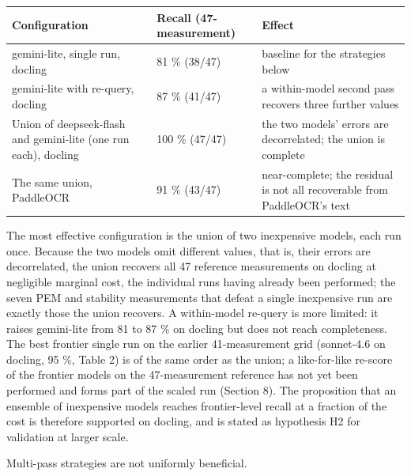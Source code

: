 \begin{longtable}[]{@{}L{0.40}L{0.16}L{0.34}@{}}
\toprule\noalign{}
Configuration & Recall (47-measurement) & Effect \\
\midrule\noalign{}
\endhead
\bottomrule\noalign{}
\endlastfoot
gemini-lite, single run, docling & 81 \% (38/47) & baseline for the
strategies below \\
gemini-lite with re-query, docling & 87 \% (41/47) & a within-model
second pass recovers three further values \\
Union of deepseek-flash and gemini-lite (one run each), docling & 100 \%
(47/47) & the two models' errors are decorrelated; the union is complete \\
The same union, PaddleOCR & 91 \% (43/47) & near-complete; the residual is
not all recoverable from PaddleOCR's text \\
\end{longtable}

The most effective configuration is the union of two inexpensive models,
each run once. Because the two models omit different values, that is,
their errors are decorrelated, the union recovers all 47 reference
measurements on docling at negligible marginal cost, the individual runs
having already been performed; the seven PEM and stability measurements
that defeat a single inexpensive run are exactly those the union
recovers. A within-model re-query is more limited: it raises gemini-lite
from 81 to 87 \% on docling but does not reach completeness. The best
frontier single run on the earlier 41-measurement grid (sonnet-4.6 on
docling, 95 \%, Table 2) is of the same order as the union; a
like-for-like re-score of the frontier models on the 47-measurement
reference has not yet been performed and forms part of the scaled run
(Section 8). The proposition that an ensemble of inexpensive models
reaches frontier-level recall at a fraction of the cost is therefore
supported on docling, and is stated as hypothesis H2 for validation at
larger scale.

Multi-pass strategies are not uniformly beneficial.

